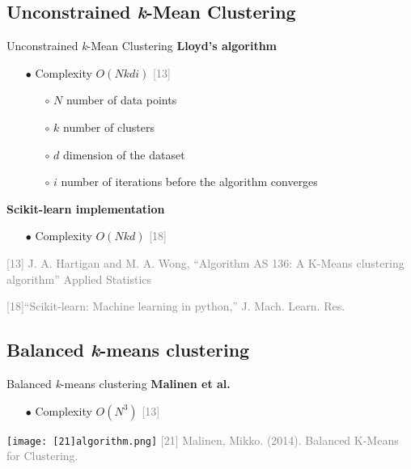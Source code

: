 \subsection{Unconstrained \textit{k}-Mean Clustering}
	\begin{frame}{Unconstrained \textit{k}-Mean Clustering}
		\textbf{Lloyd’s algorithm}
		\begin{itemize}
			\item[$\bullet$] Complexity $O(Nkdi)$ \textcolor{gray}{[13]}
			\begin{itemize}
				\item[$\circ$] $N$ number of data points
				\item[$\circ$] $k$ number of clusters 
				\item[$\circ$] $d$ dimension of the dataset
				\item[$\circ$] $i$ number of iterations before the algorithm converges
			\end{itemize} 
		\end{itemize}
		\textbf{Scikit-learn implementation}
		\begin{itemize}
			\item[$\bullet$] Complexity $O(Nkd)$ \textcolor{gray}{[18]}
		\end{itemize}
		\bigbreak
		\tiny{ %
			\textcolor{gray}{
				\begin{minipage}{0.5\textwidth} %
					[13] J. A. Hartigan and M. A. Wong, “Algorithm AS 136: A K-Means clustering algorithm” Applied Statistics
				\end{minipage}\hfill
				\begin{minipage}{0.5\textwidth} 
					[18]“Scikit-learn: Machine learning in python,” J. Mach. Learn. Res.
				\end{minipage}\hfill
			}
		}
	\end{frame}
	



\subsection{Balanced \textit{k}-means clustering}
	\begin{frame}{Balanced \textit{k}-means clustering}
		\textbf{Malinen et al.}
		\begin{itemize}
			\item[$\bullet$] Complexity $O(N^3)$ \textcolor{gray}{[13]}
		\end{itemize}
		\texttt{[image: [21]algorithm.png]}
		\break
		\tiny{ %
			\textcolor{gray}{
				[21] Malinen, Mikko. (2014). Balanced K-Means for Clustering. 
			}
		}
	\end{frame}


